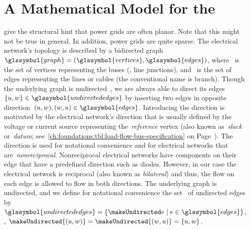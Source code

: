 \section[A Mathematical Model for the Feasibility Problem of Electrical Flows]{
A Mathematical Model for the \protect{}} 
% 
\label{ch:network-analyzes:sec:mathematical-model}
% 
\textcite[p.13]{Cai12} give the structural hint that power grids are often
planar. Note that this might not be true in general. In addition, power grids
are quite sparse.
% 
The electrical network's topology is described by a bidirected
graph~$\glssymbol{graph} = (\glssymbol{vertices},\glssymbol{edges})$,
where~ is the set of vertices representing the buses (\ie,
line junctions), and~ is the set of edges representing the
lines or cables (the conventional name is branch). Though the underlying graph
is undirected~\parencite[p.13]{Cai12}, we are always able to direct its
edges~$\{\vertexa,\vertexc\}\in
\glssymbol{undirectededges}$ by inserting two edges in opposite direction~$
(\vertexa,\vertexc), (\vertexc,\vertexa)\in\glssymbol{edges}$. Introducing the
direction is motivated by the electrical network's direction that is usually
defined by the voltage or current source representing the~\emph{reference}
vertex (also known as~\emph{slack} or~\emph{datum};
see~\cref{ch:foundations:tbl:load-flow-bus-specification} on
Page~\pageref{ch:foundations:tbl:load-flow-bus-specification}). The direction is
used for notational convenience and for electrical networks that
are~\emph{nonreciprocal}. Nonreciprocal electrical networks have components on
their edge that have a predefined direction such as diodes. However, in our case
the electrical network is reciprocal (also known as \emph{bilateral}) and thus,
the flow on each edge is allowed to flow in both directions. The underlying
graph is undirected, and we define for notational convenience the
set~ of undirected edges
by~$
    \glssymbol{undirectededges} 
    = 
    \{
        \undirectededge
        \mid
        \edge
        \in
        \glssymbol{edges}
    \}
$, \ie, $
% 
\makeUndirected{(\vertexa,\vertexc)} 
= 
\makeUndirected{(\vertexc,\vertexa)} 
= 
\{\vertexa,\vertexc\}
% 
$.

